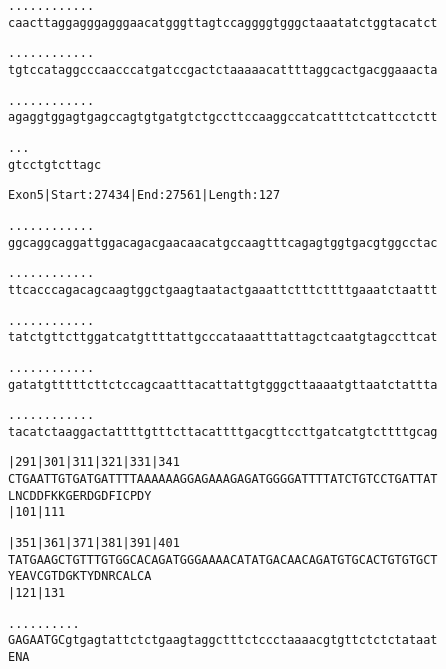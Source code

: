 \documentclass{article}
\begin{document}
\newpage
\begin{alltt}
  .    .    .    .    .    .    .    .    .    .    .    .
caacttaggagggagggaacatgggttagtccaggggtgggctaaatatctggtacatct



  .    .    .    .    .    .    .    .    .    .    .    .
tgtccataggcccaacccatgatccgactctaaaaacattttaggcactgacggaaacta



  .    .    .    .    .    .    .    .    .    .    .    .
agaggtggagtgagccagtgtgatgtctgccttccaaggccatcatttctcattcctctt



  .    .    .
gtcctgtcttagc


\end{alltt}
\newpage
\begin{alltt}
Exon 5 | Start: 27434 | End: 27561 | Length: 127

.    .    .    .    .    .    .    .    .    .    .    .
ggcaggcaggattggacagacgaacaacatgccaagtttcagagtggtgacgtggcctac



.    .    .    .    .    .    .    .    .    .    .    .
ttcacccagacagcaagtggctgaagtaatactgaaattctttcttttgaaatctaattt



.    .    .    .    .    .    .    .    .    .    .    .
tatctgttcttggatcatgttttattgcccataaatttattagctcaatgtagccttcat



.    .    .    .    .    .    .    .    .    .    .    .
gatatgtttttcttctccagcaatttacattattgtgggcttaaaatgttaatctattta



.    .    .    .    .    .    .    .    .    .    .    .
tacatctaaggactattttgtttcttacattttgacgttccttgatcatgtcttttgcag



        |291      |301      |311      |321      |331      |341
CTGAATTGTGATGATTTTAAAAAAGGAGAAAGAGATGGGGATTTTATCTGTCCTGATTAT
L  N  C  D  D  F  K  K  G  E  R  D  G  D  F  I  C  P  D  Y
                  |101                          |111

        |351      |361      |371      |381      |391      |401
TATGAAGCTGTTTGTGGCACAGATGGGAAAACATATGACAACAGATGTGCACTGTGTGCT
Y  E  A  V  C  G  T  D  G  K  T  Y  D  N  R  C  A  L  C  A
                  |121                          |131

            .    .    .    .    .    .    .    .    .    .
GAGAATGCgtgagtattctctgaagtaggctttctccctaaaacgtgttctctctataat
E  N  A


\end{alltt}
\end{document}
